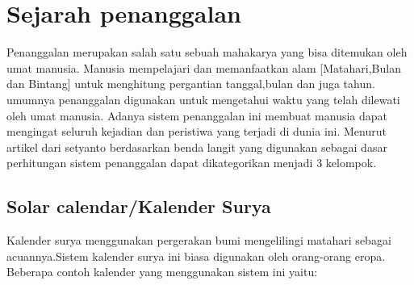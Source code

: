 

\section{Sejarah penanggalan}
  Penanggalan merupakan salah satu sebuah mahakarya yang bisa ditemukan oleh umat manusia. Manusia mempelajari dan memanfaatkan alam [Matahari,Bulan dan Bintang] untuk menghitung pergantian tanggal,bulan dan juga tahun.
umumnya penanggalan digunakan untuk mengetahui waktu yang telah dilewati oleh umat manusia. Adanya sistem penanggalan ini membuat manusia dapat mengingat seluruh kejadian dan peristiwa yang terjadi di dunia ini.
Menurut artikel dari setyanto berdasarkan benda langit yang digunakan sebagai dasar perhitungan sistem penanggalan dapat dikategorikan menjadi 3 kelompok\cite{setyanto2015kriteria}.

  \subsection{Solar calendar/Kalender Surya}
    Kalender surya menggunakan pergerakan bumi mengelilingi matahari sebagai acuannya.Sistem kalender surya ini biasa digunakan oleh orang-orang eropa. Beberapa contoh kalender yang menggunakan sistem ini yaitu:

